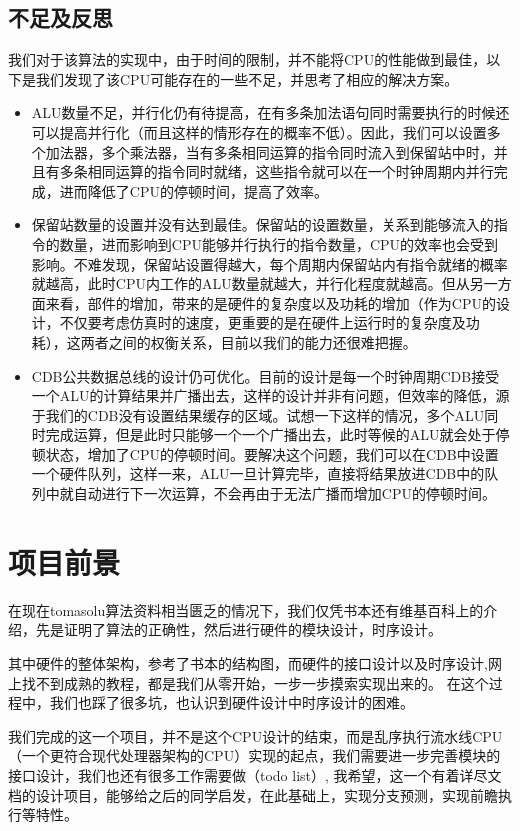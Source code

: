 \documentclass[twoside]{article}
\begin{document}
\subsection{不足及反思}
我们对于该算法的实现中，由于时间的限制，并不能将CPU的性能做到最佳，以下是我们发现了该CPU可能存在的一些不足，并思考了相应的解决方案。
\begin{itemize}
    \item ALU数量不足，并行化仍有待提高，在有多条加法语句同时需要执行的时候还可以提高并行化（而且这样的情形存在的概率不低）。因此，我们可以设置多个加法器，多个乘法器，当有多条相同运算的指令同时流入到保留站中时，并且有多条相同运算的指令同时就绪，这些指令就可以在一个时钟周期内并行完成，进而降低了CPU的停顿时间，提高了效率。
    \item 保留站数量的设置并没有达到最佳。保留站的设置数量，关系到能够流入的指令的数量，进而影响到CPU能够并行执行的指令数量，CPU的效率也会受到影响。不难发现，保留站设置得越大，每个周期内保留站内有指令就绪的概率就越高，此时CPU内工作的ALU数量就越大，并行化程度就越高。但从另一方面来看，部件的增加，带来的是硬件的复杂度以及功耗的增加（作为CPU的设计，不仅要考虑仿真时的速度，更重要的是在硬件上运行时的复杂度及功耗），这两者之间的权衡关系，目前以我们的能力还很难把握。
    \item CDB公共数据总线的设计仍可优化。目前的设计是每一个时钟周期CDB接受一个ALU的计算结果并广播出去，这样的设计并非有问题，但效率的降低，源于我们的CDB没有设置结果缓存的区域。试想一下这样的情况，多个ALU同时完成运算，但是此时只能够一个一个广播出去，此时等候的ALU就会处于停顿状态，增加了CPU的停顿时间。要解决这个问题，我们可以在CDB中设置一个硬件队列，这样一来，ALU一旦计算完毕，直接将结果放进CDB中的队列中就自动进行下一次运算，不会再由于无法广播而增加CPU的停顿时间。
\end{itemize}


\section{项目前景}
在现在tomasolu算法资料相当匮乏的情况下，我们仅凭书本还有维基百科上的介绍，先是证明了算法的正确性，然后进行硬件的模块设计，时序设计。

其中硬件的整体架构，参考了书本的结构图，而硬件的接口设计以及时序设计,网上找不到成熟的教程，都是我们从零开始，一步一步摸索实现出来的。
在这个过程中，我们也踩了很多坑，也认识到硬件设计中时序设计的困难。

我们完成的这一个项目，并不是这个CPU设计的结束，而是乱序执行流水线CPU（一个更符合现代处理器架构的CPU）实现的起点，我们需要进一步完善模块的接口设计，我们也还有很多工作需要做（todo list）, 我希望，这一个有着详尽文档的设计项目，能够给之后的同学启发，在此基础上，实现分支预测，实现前瞻执行等特性。
\end{document}
